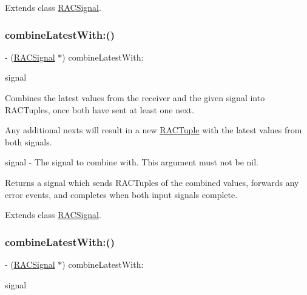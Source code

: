 Extends class \mbox{\hyperlink{interface_r_a_c_signal_a5e4d2db914a14c415646d9fdda131221}{R\+A\+C\+Signal}}.

\mbox{\label{category_r_a_c_signal_07_operations_08_afab1b19558df566351cf87e466a5022f}} 
\subsubsection{\texorpdfstring{combine\+Latest\+With\+:()}{combineLatestWith:()}\hspace{0.1cm}{\footnotesize\ttfamily [1/3]}}
{\footnotesize\ttfamily -\/ (\mbox{\hyperlink{interface_r_a_c_signal}{R\+A\+C\+Signal}} $\ast$) combine\+Latest\+With\+: \begin{DoxyParamCaption}\item[{(\mbox{\hyperlink{interface_r_a_c_signal}{R\+A\+C\+Signal}} $\ast$)}]{signal }\end{DoxyParamCaption}}

Combines the latest values from the receiver and the given signal into R\+A\+C\+Tuples, once both have sent at least one {\ttfamily next}.

Any additional {\ttfamily next}s will result in a new \mbox{\hyperlink{interface_r_a_c_tuple}{R\+A\+C\+Tuple}} with the latest values from both signals.

signal -\/ The signal to combine with. This argument must not be nil.

Returns a signal which sends R\+A\+C\+Tuples of the combined values, forwards any {\ttfamily error} events, and completes when both input signals complete. 

Extends class \mbox{\hyperlink{interface_r_a_c_signal_afab1b19558df566351cf87e466a5022f}{R\+A\+C\+Signal}}.

\mbox{\label{category_r_a_c_signal_07_operations_08_afab1b19558df566351cf87e466a5022f}} 
\subsubsection{\texorpdfstring{combine\+Latest\+With\+:()}{combineLatestWith:()}\hspace{0.1cm}{\footnotesize\ttfamily [2/3]}}
{\footnotesize\ttfamily -\/ (\mbox{\hyperlink{interface_r_a_c_signal}{R\+A\+C\+Signal}} $\ast$) combine\+Latest\+With\+: \begin{DoxyParamCaption}\item[{(\mbox{\hyperlink{interface_r_a_c_signal}{R\+A\+C\+Signal}} $\ast$)}]{signal }\end{DoxyParamCaption}}

